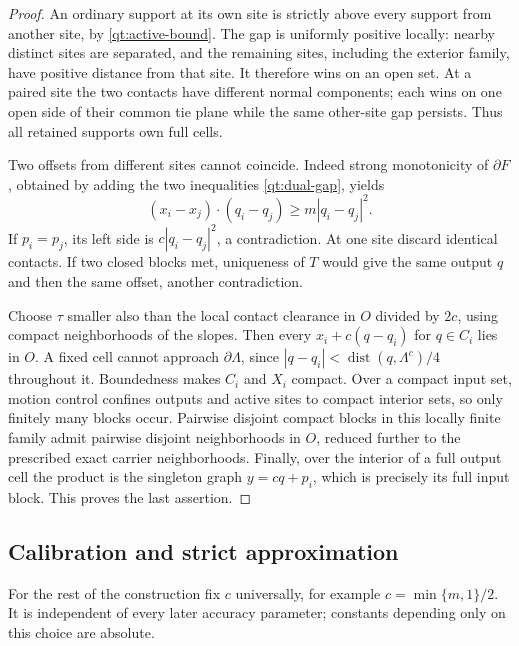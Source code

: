 \documentclass[11pt]{article}
\numberwithin{equation}{section}
\theoremstyle{definition}
\theoremstyle{remark}
\begin{document}
\begin{proof}
An ordinary support at its own site is strictly above every support
from another site, by \eqref{qt:active-bound}.  The gap is uniformly
positive locally: nearby distinct sites are separated, and the
remaining sites, including the exterior family, have positive distance
from that site.  It therefore wins on an open set.  At a paired site
the two contacts have different normal components; each wins on one
open side of their common tie plane while the same other-site gap
persists.  Thus all retained supports own full cells.

Two offsets from different sites cannot coincide.  Indeed strong
monotonicity of $\partial F$, obtained by adding the two inequalities
\eqref{qt:dual-gap}, yields
\[
 (x_i-x_j)\cdot(q_i-q_j)\geq m|q_i-q_j|^2.
\]
If $p_i=p_j$, its left side is $c|q_i-q_j|^2$, a contradiction.
At one site discard identical contacts.  If two closed blocks met,
uniqueness of $T$ would give the same output $q$ and then the same
offset, another contradiction.

Choose $\tau$ smaller also than the local contact clearance in $O$
divided by $2c$, using compact neighborhoods of the slopes.
Then every $x_i+c(q-q_i)$ for $q\in C_i$ lies in $O$.  A fixed cell
cannot approach $\partial\Lambda$, since
$|q-q_i|<\operatorname{dist}(q,\Lambda^c)/4$ throughout it.  Boundedness makes $C_i$
and $X_i$ compact.  Over a compact input set, motion control confines
outputs and active sites to compact interior sets, so only finitely
many blocks occur.  Pairwise disjoint compact blocks in this locally
finite family admit pairwise disjoint neighborhoods in $O$, reduced
further to the prescribed exact carrier neighborhoods.  Finally, over
the interior of a full output cell the product is the singleton graph
$y=cq+p_i$, which is precisely its full input block.  This proves the
last assertion.
\end{proof}

\subsection{Calibration and strict approximation}

For the rest of the construction fix $c$ universally, for example
$c=\min\{m,1\}/2$.  It is independent of every later accuracy
parameter; constants depending only on this choice are absolute.
\end{document}
